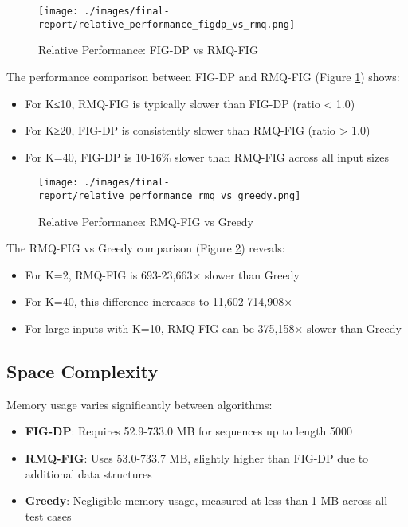 \documentclass[12pt]{article}
\begin{document}
\begin{figure}[H]
    \centering
    \texttt{[image: ./images/final-report/relative\_performance\_figdp\_vs\_rmq.png]}
    \caption{Relative Performance: FIG-DP vs RMQ-FIG}
    \label{fig:figdp_vs_rmq}
\end{figure}

The performance comparison between FIG-DP and RMQ-FIG (Figure \ref{fig:figdp_vs_rmq}) shows:
\begin{itemize}
    \item For K≤10, RMQ-FIG is typically slower than FIG-DP (ratio < 1.0)
    \item For K≥20, FIG-DP is consistently slower than RMQ-FIG (ratio > 1.0)
    \item For K=40, FIG-DP is 10-16\% slower than RMQ-FIG across all input sizes
\end{itemize}

\begin{figure}[H]
    \centering
    \texttt{[image: ./images/final-report/relative\_performance\_rmq\_vs\_greedy.png]}
    \caption{Relative Performance: RMQ-FIG vs Greedy}
    \label{fig:rmq_vs_greedy}
\end{figure}

The RMQ-FIG vs Greedy comparison (Figure \ref{fig:rmq_vs_greedy}) reveals:
\begin{itemize}
    \item For K=2, RMQ-FIG is 693-23,663× slower than Greedy
    \item For K=40, this difference increases to 11,602-714,908×
    \item For large inputs with K=10, RMQ-FIG can be 375,158× slower than Greedy
\end{itemize}

\subsection{Space Complexity}
Memory usage varies significantly between algorithms:
\begin{itemize}
    \item \textbf{FIG-DP}: Requires 52.9-733.0 MB for sequences up to length 5000
    \item \textbf{RMQ-FIG}: Uses 53.0-733.7 MB, slightly higher than FIG-DP due to additional data structures
    \item \textbf{Greedy}: Negligible memory usage, measured at less than 1 MB across all test cases
\end{itemize}
\end{document}
